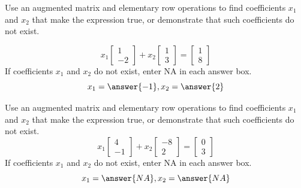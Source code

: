 \documentclass{ximera}
\begin{document}
 \begin{problem}\label{prob:lincombeq1}
 Use an augmented matrix and elementary row operations to find coefficients $x_1$ and $x_2$ that make the expression true, or demonstrate that such coefficients do not exist.

    $$ x_1\begin{bmatrix}
           1\\
           -2
         \end{bmatrix}+ x_2\begin{bmatrix}
           1\\
           3
         \end{bmatrix}=\begin{bmatrix}
           1\\
           8
         \end{bmatrix}$$
 If coefficients $x_1$ and $x_2$ do not exist, enter NA in each answer box.        
 $$x_1=\answer{-1}, x_2=\answer{2}$$        
         \end{problem}



\begin{problem}\label{prob:lincombeq2}
Use an augmented matrix and elementary row operations to find coefficients $x_1$ and $x_2$ that make the expression true, or demonstrate that such coefficients do not exist.
 $$ x_1\begin{bmatrix}
           4\\
           -1
         \end{bmatrix}+ x_2\begin{bmatrix}
           -8\\
           2
         \end{bmatrix}=\begin{bmatrix}
           0\\
           3
         \end{bmatrix}$$
If coefficients $x_1$ and $x_2$ do not exist, enter NA in each answer box.        
 $$x_1=\answer{NA}, x_2=\answer{NA}$$ 
  \end{problem}
 
\end{document}

